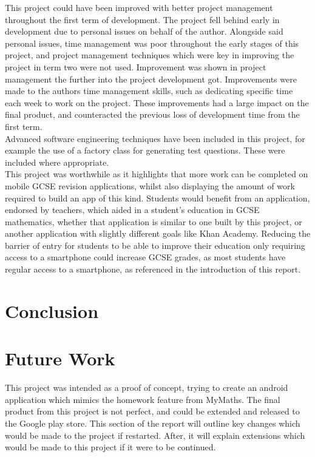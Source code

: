 \documentclass{article}
\begin{document}
This project could have been improved with better project management throughout the first term of development. The project fell behind early in development due to personal issues on behalf of the author. Alongside said personal issues, time management was poor throughout the early stages of this project, and project management techniques which were key in improving the project in term two were not used. Improvement was shown in project management the further into the project development got. Improvements were made to the authors time management skills, such as dedicating specific time each week to work on the project. These improvements had a large impact on the final product, and counteracted the previous loss of development time from the first term. \\

Advanced software engineering techniques have been included in this project, for example the use of a factory class for generating test questions. These were included where appropriate. \\

This project was worthwhile as it highlights that more work can be completed on mobile GCSE revision applications, whilst also displaying the amount of work required to build an app of this kind. Students would benefit from an application, endorsed by teachers, which aided in a student's education in GCSE mathematics, whether that application is similar to one built by this project, or another application with slightly different goals like Khan Academy. Reducing the barrier of entry for students to be able to improve their education only requiring access to a smartphone could increase GCSE grades, as most students have regular access to a smartphone, as referenced in the introduction of this report. \\

\section{Conclusion}
\label{section:conclusion}

\section{Future Work}
\label{section:futureWork}

This project was intended as a proof of concept, trying to create an android application which mimics the homework feature from MyMaths. The final product from this project is not perfect, and could be extended and released to the Google play store. This section of the report will outline key changes which would be made to the project if restarted. After, it will explain extensions which would be made to this project if it were to be continued. \\
\end{document}
